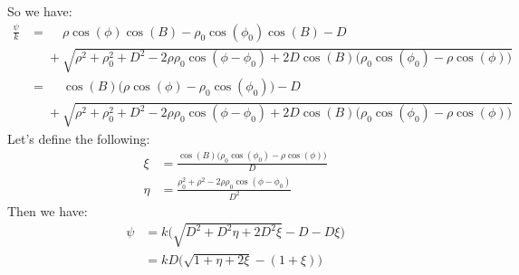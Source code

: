 \documentclass{article}
\theoremstyle{mystyle}
\begin{document}
So we have:
\begin{align*}
\frac{\psi}{k} &=\phantom{+}\rho\cos(\phi)\cos(B) - \rho_0\cos(\phi_0)\cos(B)-D\\
&\phantom{=}+\sqrt{\rho^2+\rho_{0}^2 + D^2 - 2\rho\rho_{0}\cos(\phi - \phi_{0}) + 2D\cos(B)\big(\rho_{0}\cos(\phi_0) - \rho\cos(\phi)\big)} \\
&=\phantom{+}\cos(B)\big(\rho\cos(\phi) - \rho_{0}\cos(\phi_{0})\big) - D\\
&\phantom{=}+\sqrt{\rho^2+\rho_{0}^2 + D^2 - 2\rho\rho_{0}\cos(\phi - \phi_{0}) + 2D\cos(B)\big(\rho_{0}\cos(\phi_0) - \rho\cos(\phi)\big)}
\end{align*}
Let's define the following:
\begin{align*}
\xi &= \frac{\cos(B)\big(\rho_{0}\cos(\phi_{0})-\rho\cos(\phi)\big)}{D} \\
\eta &= \frac{\rho_{0}^2+\rho^2-2\rho\rho_{0}\cos(\phi-\phi_{0})}{D^2}
\end{align*}
Then we have:
\begin{align*}
\nonumber\psi &= k\big(\sqrt{D^2+D^2\eta + 2D^2\xi}-D-D\xi\big)\\
&= kD\big(\sqrt{1+\eta+2\xi}-(1+\xi)\big)
\end{align*}
\end{document}
